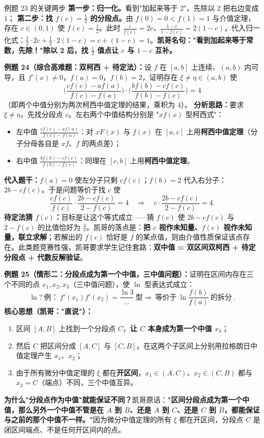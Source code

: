 \documentclass[a4paper]{article}
\begin{document}
\begin{warningbox}{例题 23 的关键两步}
\textbf{第一步：归一化。}看到"加起来等于 2"，先除以 2 把右边变成 1；
\textbf{第二步：找 $f(c)=\frac12$ 的分段点。}由 $f(0)=0<f(1)=1$ 与介值定理，存在 $c\in(0,1)$ 使 $f(c)=\frac12$。此时 $\frac{c}{f(c)}=2c$、$\frac{1-c}{1-f(c)}=2(1-c)$，代入归一化式：$\frac12\cdot2c+\frac12\cdot2(1-c)=c+(1-c)=1$。\textbf{凯哥名句："看到加起来等于常数，先除！"除以 2 后，找 $\frac12$ 值点让 $c$ 与 $1-c$ 互补。}
\end{warningbox}

\textbf{例题 24（综合高难题：双柯西 + 待定法）：}设 $f$ 在 $[a,b]$ 上连续、$(a,b)$ 内可导，且 $f'(x)\neq0$，$f(a)=0$，$f(b)=2$，证明存在 $\xi\neq\eta\in(a,b)$ 使
\[
\Big(\frac{c f(c)-a f(a)}{f(c)-f(a)}\Big)\cdot\Big(\frac{b f(b)-c f(c)}{f(b)-f(c)}\Big)=4
\]
（即两个中值分别为两次柯西中值定理的结果，乘积为 4）。
\textbf{分析思路：}要求 $\xi\neq\eta$，先找分段点 $c$。左右两个中值结构分别是 "$xf(x)$ 型柯西式"：
\begin{itemize}
\item 左中值 $\frac{c f(c)-a f(a)}{f(c)-f(a)}$：对 $xF(x)$ 与 $f(x)$ 在 $[a,c]$ 上用\textbf{柯西中值定理}（分子分母各自是 $xf$、$f$ 的两点差）；
\item 右中值 $\frac{b f(b)-c f(c)}{f(b)-f(c)}$：同理在 $[c,b]$ 上用\textbf{柯西中值定理}。
\end{itemize}
\textbf{代入题干：}$f(a)=0$ 使左分子只剩 $c f(c)$；$f(b)=2$ 代入右分子：$2b-c f(c)$。于是问题等价于找 $c$ 使
\[
\frac{c f(c)}{f(c)}\cdot\frac{2b-c f(c)}{2-f(c)}=4 \quad\Rightarrow\quad c\cdot\frac{2b-c f(c)}{2-f(c)}=4 .
\]
\textbf{待定法猜 $f(c)$：}目标是让这个等式成立——猜 $f(c)$ 使 $2b-c f(c)$ 与 $2-f(c)$ 的比值恰好为 $\frac4c$。凯哥的落点是：\textbf{把 $c$ 视作未知量、$f(c)$ 视作未知量，联立求解}；若解出的 $f(c)$ 恰好是 $f$ 的某点值，则由介值性质保证该点存在。此类题竞赛性强，凯哥要求学生记住套路：\textbf{双中值 = 双区间双柯西 + 待定分段点 + 代数反解验证}。

\textbf{例题 25（情形二：分段点成为第一个中值，三中值问题）：}证明在区间内存在三个不同的点 $x_1,x_2,x_3$（三中值问题），使 $\ln$ 型表达式成立：
\[
\ln?\ \text{例：}\ f'(x_1)f'(x_2)=\frac{\ln 3}{\dots}\ \text{型}\Rightarrow\ \text{等价于}\ \ln\frac{f(b)}{f(a)}\ \text{的拆分}\ .
\]
\textbf{核心思想（凯哥："直说"）：}
\begin{enumerate}
\item 区间 $[A,B]$ 上找到一个分段点 $C$，\textbf{让 $C$ 本身成为第一个中值 $x_3$}；
\item 然后 $C$ 把区间分成 $[A,C]$ 与 $[C,B]$，在这两个子区间上分别用拉格朗日中值定理产生 $x_1$、$x_2$；
\item 由于所有微分中值定理的 $\xi$ 都在\textbf{开区间}，$x_1\in(A,C)$、$x_2\in(C,B)$ 都与 $x_3=C$（端点）不同，三个中值互异。
\end{enumerate}
\textbf{为什么"分段点作为中值"就能保证不同？}凯哥原话：\textbf{"区间分段点成为第一个中值，那么另外一个中值不管是在 $A$ 到 $B$、还是 $A$ 到 $C$、还是 $C$ 到 $B$，都能保证与之前的那个中值不一样。"}因为微分中值定理的所有 $\xi$ 都在开区间，分段点 $C$ 是闭区间端点、不是任何开区间内的点。
\end{document}
